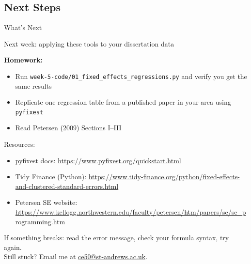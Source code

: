 \documentclass[9pt,aspectratio=169]{beamer}
\begin{document}
\subsection{Next Steps}
\begin{frame}{What's Next}

\bi
    \item Next week: applying these tools to \alert{your dissertation data}
    \item \textbf{Homework:}
    \begin{itemize}
        \item Run \texttt{week-5-code/01\_fixed\_effects\_regressions.py} and verify you get the same results
        \item Replicate one regression table from a published paper in your area using \texttt{pyfixest}
        \item Read Petersen (2009) Sections I--III
    \end{itemize}
    \item Resources:
    \begin{itemize}
        \item pyfixest docs: \url{https://www.pyfixest.org/quickstart.html}
        \item Tidy Finance (Python): \url{https://www.tidy-finance.org/python/fixed-effects-and-clustered-standard-errors.html}
        \item Petersen SE website: \url{https://www.kellogg.northwestern.edu/faculty/petersen/htm/papers/se/se_programming.htm}
    \end{itemize}
\ei

\medskip

\begin{highlightbox}
\centering
If something breaks: read the error message, check your formula syntax, try again.\\
Still stuck? Email me at \href{mailto:ce50@st-andrews.ac.uk}{ce50@st-andrews.ac.uk}.
\end{highlightbox}

\end{frame}
\end{document}
